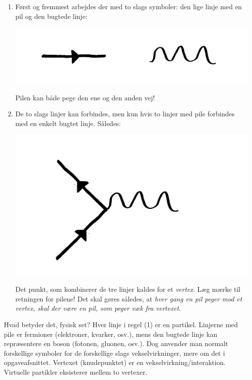 \begin{enumerate}

\item Først og fremmest arbejdes der med to slags symboler: den lige
  linje med en pil og den bugtede linje:
	\begin{minipage}[c]{\textwidth}
	\centering
     \includegraphics[width=6 cm]{KernePartikel/fig_p/symbols.png}
	\end{minipage}
Pilen kan både pege den ene og den anden vej!

\item De to slags linjer kan forbindes, men kun hvis to linjer med
  pile forbindes med en enkelt bugtet linje. Således:
	\begin{minipage}[c]{\textwidth}
	\centering
     \includegraphics[width=5 cm]{KernePartikel/fig_p/QEDvertex2.png}
	\end{minipage}
        Det punkt, som kombinerer de tre linjer kaldes for et
        \emph{vertex}. Læg mærke til retningen for pilene! Det skal
        gøres således, at \emph{ hver gang en pil peger mod et vertex,
          skal der være en pil, som peger væk fra vertexet}.
\end{enumerate}
Hvad betyder det, fysisk set?  Hver linje i regel (1) er en
partikel. Linjerne med pile er fermioner (elektroner, kvarker, osv.),
mens den bugtede linje kan repræsentere en boson (fotonen, gluonen,
osv.). Dog anvender man normalt forskellige symboler for de
forskellige slags vekselvirkninger, mere om det i opgaveafsnittet.
Vertexet (knudepunktet) er en vekselvirkning/interaktion. Virtuelle partikler eksisterer mellem to vertexer. 

